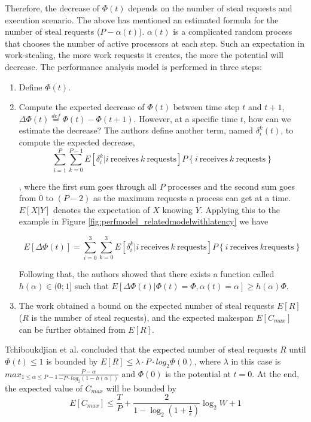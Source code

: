 Therefore, the decrease of $\Phi (t)$ depends on the number of steal requests and execution scenario. The above has mentioned an estimated formula for the number of steal requests ($P - \alpha(t)$). $\alpha(t)$ is a complicated random process that chooses the number of active processors at each step. Such an expectation in work-stealing, the more work requests it creates, the more the potential will decrease. The performance analysis model is performed in three steps:
\begin{enumerate}
	\item Define $\Phi (t)$.
	\item Compute the expected decrease of $\Phi (t)$ between time step $t$ and $t+1$, $\Delta \Phi (t) \overset{def}{=} \Phi (t) - \Phi (t+1)$. However, at a specific time $t$, how can we estimate the decrease? The authors define another term, named $\delta_{i}^{k}(t)$, to compute the expected decrease,
	\begin{equation} \label{eq:expect_decrease}
		\sum_{i=1}^{P} \sum_{k=0}^{P-1} E [\delta_{i}^{k}|i\ \textrm{receives}\ k\ \textrm{requests}]P\left \{ i\ \textrm{receives}\ k\ \textrm{requests} \right \}
	\end{equation}
	
 , where the first sum goes through all $P$ processes and the second sum goes from $0$ to $(P-2)$ as the maximum requests a process can get at a time. $E[X|Y]$ denotes the expectation of $X$ knowing $Y$. Applying this to the example in Figure \ref{fig:perfmodel_relatedmodelwithlatency} we have
	
	\begin{equation}
		E[\Delta \Phi (t)] = \sum_{i=0}^{3} \sum_{k=0}^{3} E [\delta_{i}^{k}|i\ \textrm{receives}\ k\ \textrm{requests}]P\left \{ i\ \textrm{receives}\ k \textrm{requests} \right \}
	\end{equation}

	Following that, the authors showed that there exists a function called $h(\alpha) \in (0;1]$ such that $E[\Delta \Phi (t)|\Phi (t) = \Phi,\alpha(t) = \alpha] \geq h(\alpha) \Phi$.
	
	\item The work \cite{tchiboukdjian2010tighter} obtained a bound on the expected number of steal requests $E[R]$ ($R$ is the number of steal requests), and the expected makespan $E[C_{max}]$ can be further obtained from $E[R]$.
\end{enumerate}

Tchiboukdjian et al. \cite{tchiboukdjian2010tighter} concluded that the expected number of steal requests $R$ until $\Phi(t) \leq 1$ is bounded by $E[R] \leq \lambda \cdot P \cdot log_{2} \Phi(0)$, where $\lambda$ in this case is $max_{1 \leq \alpha \leq P-1} \frac{P-\alpha}{-P \cdot log_{2}(1-h(\alpha))}$ and $\Phi(0)$ is the potential at $t=0$. At the end, the expected value of $C_{max}$ will be bounded by 
\begin{equation}
	E[C_{max}] \leq \frac{T}{P} + \frac{2}{1-\log_{2}(1+\frac{1}{\epsilon})} \log_{2}W + 1
\end{equation}

